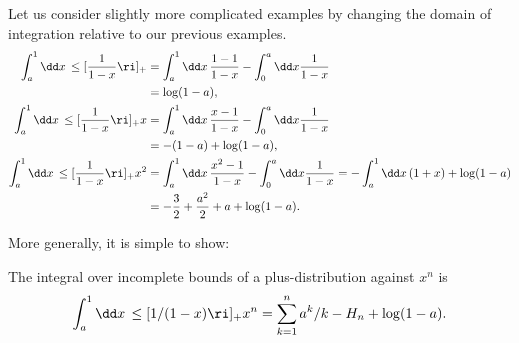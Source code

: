 Let us consider slightly more complicated examples by changing the domain of integration relative to our previous examples.
\begin{align}
    \int_{a}^{1} \dd x\,\le[\frac{1}{1-x}\ri]_+
    &=
    \int_{a}^{1} \dd x\,\frac{1-1}{1-x} - \int_0^a \dd x \frac{1}{1-x}
    \\
    &=
    \log(1-a)
    \notag
    ,
    \\
    \int_{a}^{1} \dd x\,\le[\frac{1}{1-x}\ri]_+ x
    &=
    \int_{a}^{1} \dd x\,\frac{x-1}{1-x} - \int_0^a \dd x \frac{1}{1-x}
    \\
    &=
    -(1 - a) + \log(1-a)
    \notag
    ,
    \\
    \int_{a}^{1} \dd x\,\le[\frac{1}{1-x}\ri]_+ x^2
    &=
    \int_{a}^{1} \dd x\,\frac{x^2 - 1}{1-x} - \int_0^a \dd x \frac{1}{1-x}
    =
    -\int_a^1 \dd x\, (1+x) + \log(1-a)
    \\
    \notag
    &= -\frac{3}{2} + \frac{a^2}{2} + a + \log(1-a)
    .
\end{align}

More generally, it is simple to show:
~\\
\begin{example}{}
    The integral over incomplete bounds of a plus-distribution against \(x^n\) is
    \begin{align}
        \int_{a}^{1} \dd x\,\le[1/(1-x)\ri]_+ x^n
        =
        \sum_{k=1}^n a^k/k - H_n + \log(1-a).
    \end{align}
\end{example}

